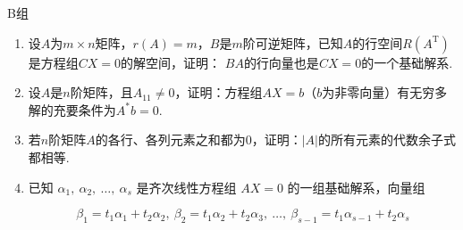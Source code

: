 \centerline{\heiti B组}
\begin{enumerate}
    \item 设$A$为$m \times n$矩阵，$r(A)=m$，$B$是$m$阶可逆矩阵，已知$A$的行空间$R(A^\mathrm{T})$是方程组$CX=0$的解空间，证明：
    $BA$的行向量也是$CX=0$的一个基础解系.
    \item 设$A$是$n$阶矩阵，且$A_{11}\neq 0$，证明：方程组$AX=b$（$b$为非零向量）有无穷多解的充要条件为$A^*b=0$.
    \item 若$n$阶矩阵$A$的各行、各列元素之和都为0，证明：$|A|$的所有元素的代数余子式都相等.
    \item 已知 $\alpha_1,\ \alpha_2,\ \dots,\ \alpha_s$ 是齐次线性方程组 $AX=0$ 的一组基础解系，向量组

    \[\beta_1=t_1\alpha_1+t_2\alpha_2,\ \beta_2=t_1\alpha_2+t_2\alpha_3,\ \dots,\ \beta_{s-1}=t_1\alpha_{s-1}+t_2\alpha_s\]
    

\end{enumerate}
